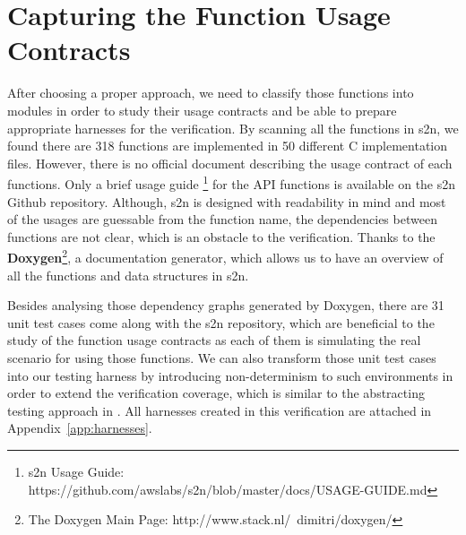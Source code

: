 \section{Capturing the Function Usage Contracts}
\label{sec:cfuc}
After choosing a proper approach, we need to classify those functions into modules in order to study their usage contracts and be able to prepare appropriate harnesses for the verification. By scanning all the functions in s2n, we found there are 318 functions are implemented in 50 different C implementation files. However, there is no official document describing the usage contract of each functions. Only a brief usage guide \footnote{s2n Usage Guide: https://github.com/awslabs/s2n/blob/master/docs/USAGE-GUIDE.md} for the API functions is available on the s2n Github repository. Although, s2n is designed with readability in mind and most of the usages are guessable from the function name, the dependencies between functions are not clear, which is an obstacle to the verification. Thanks to the \textbf{Doxygen}\footnote{The Doxygen Main Page: http://www.stack.nl/~dimitri/doxygen/}, a documentation generator, which allows us to have an overview of all the functions and data structures in s2n. 

Besides analysing those dependency graphs generated by Doxygen, there are 31 unit test cases come along with the s2n repository, which are beneficial to the study of the function usage contracts as each of them is simulating the real scenario for using those functions. We can also transform those unit test cases into our testing harness by introducing non-determinism to such environments in order to extend the verification coverage, which is similar to the abstracting testing approach in \cite{Merz:2015:BGT:2837773.2837824}. All harnesses created in this verification are attached in Appendix~\ref{app:harnesses}.





